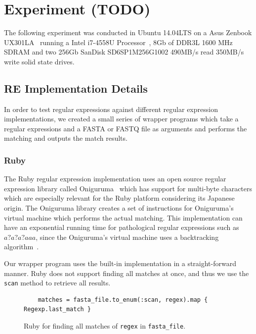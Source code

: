 \documentclass[12pt]{article}
\theoremstyle{definition}
\begin{document}
\newpage

\section{Experiment (TODO)}

The following experiment was conducted in Ubuntu 14.04LTS on a Asus Zenbook UX301LA~\cite{computer} running a Intel i7-4558U Processor~\cite{processor}, 8Gb of DDR3L 1600 MHz SDRAM and two 256Gb SanDisk SD6SP1M256G1002 490MB/s read 350MB/s write solid state drives.

\subsection{RE Implementation Details}

In order to test regular expressions against different regular expression implementations, we created a small series of wrapper programs which take a regular expressions and a FASTA or FASTQ file as arguments and performs the matching and outputs the match results.

\subsubsection{Ruby}

The Ruby regular expression implementation uses an open source regular expression library called Oniguruma~\cite{oniguruma} which has support for multi-byte characters which are especially relevant for the Ruby platform considering its Japanese origin. The Oniguruma library creates a set of instructions for Oniguruma's virtual machine which performs the actual matching. This implementation can have an exponential running time for pathological regular expressions such as $a?a?a?aaa$, since the Oniguruma's virtual machine uses a backtracking algorithm~\cite{oniguruma-overview}.

Our wrapper program uses the built-in implementation in a straight-forward manner. Ruby does not support finding all matches at once, and thus we use the \texttt{scan} method to retrieve all results.

\begin{figure}[H]
	\begin{lstlisting}
	matches = fasta_file.to_enum(:scan, regex).map { Regexp.last_match }
	\end{lstlisting}
	\caption{Ruby for finding all matches of \texttt{regex} in \texttt{fasta\_file}.}
\end{figure}
\end{document}
